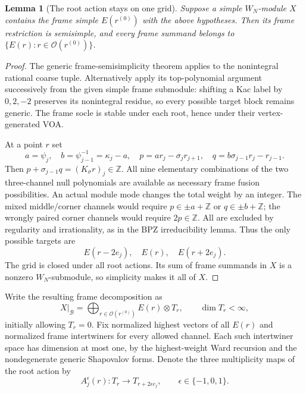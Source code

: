 \documentclass[11pt,a4paper]{article}
\numberwithin{equation}{section}
\newtheorem{lemma}[theorem]{Lemma}
\theoremstyle{definition}\newtheorem{definition}[theorem]{Definition}
\theoremstyle{remark}\newtheorem{remark}[theorem]{Remark}
\begin{document}
\begin{lemma}[The root action stays on one grid]
\label{g:lem:generic-grid-closure}
Suppose a simple $W_N$-module $X$ contains the frame simple
$E(r^{(0)})$ with the above hypotheses. Then its frame restriction
is semisimple, and every frame summand belongs to
$\{E(r):r\in\mathcal O(r^{(0)})\}$.
\end{lemma}
\begin{proof}
The generic frame-semisimplicity theorem applies to the nonintegral
rational coarse tuple. Alternatively apply its top-polynomial argument
successively from the given simple frame submodule: shifting a Kac
label by $0,2,-2$ preserves its nonintegral residue, so every
possible target block remains generic. The frame socle is stable
under each root, hence under their vertex-generated VOA.

At a point $r$ set
\[
 a=\psi_j,\quad b=\psi_{j-1}^{-1}=\kappa_j-a,
 \quad p=ar_j-\sigma_jr_{j+1},
 \quad q=b\sigma_{j-1}r_j-r_{j-1}.
\]
Then $p+\sigma_{j-1}q=(K_\sigma r)_j\in\mathbb Z$.
All nine elementary combinations of the two three-channel null
polynomials are available as necessary frame fusion possibilities.
An actual module mode changes the total weight by an integer. The
mixed middle/corner channels would require
$p\in\pm a+\mathbb Z$ or $q\in\pm b+\mathbb Z$; the
wrongly paired corner channels would require $2p\in\mathbb Z$.
All are excluded by regularity and irrationality, as in the BPZ
irreducibility lemma. Thus the only possible targets are
\[
                 E(r-2e_j),\quad E(r),\quad E(r+2e_j).
\]
The grid is closed under all root actions. Its sum of frame summands
in $X$ is a nonzero $W_N$-submodule, so simplicity makes it all of $X$.
\end{proof}

Write the resulting frame decomposition as
\[
 X\big|_{\mathcal B}
       =\bigoplus_{r\in\mathcal O(r^{(0)})}E(r)\otimes T_r,
 \qquad\dim T_r<\infty,
\]
initially allowing $T_r=0$. Fix normalized highest vectors of all
$E(r)$ and normalized frame intertwiners for every allowed channel.
Each such intertwiner space has dimension at most one, by the
highest-weight Ward recursion and the nondegenerate generic
Shapovalov forms. Denote
the three multiplicity maps of the root action by
\[
 A_j^\epsilon(r):T_r\longrightarrow T_{r+2\epsilon e_j},
                 \qquad\epsilon\in\{-1,0,1\}.
\]
\end{document}
